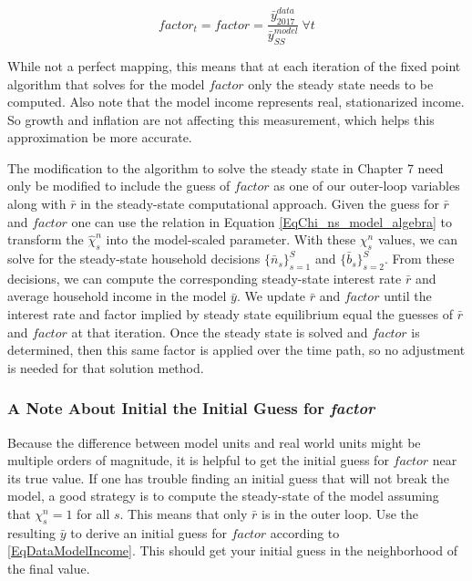 \documentclass[letterpaper,12pt]{article}
\theoremstyle{definition}
\begin{document}
    \begin{equation}
      factor_{t}=factor=\frac{\bar{y}^{data}_{2017}}{\bar{y}^{model}_{SS}} \ \forall t
    \end{equation}

    While not a perfect mapping, this means that at each iteration of the fixed point algorithm that solves for the model $factor$ only the steady state needs to be computed.  Also note that the model income represents real, stationarized income.  So growth and inflation are not affecting this measurement, which helps this approximation be more accurate.

    The modification to the algorithm to solve the steady state in Chapter 7 need only be modified to include the guess of $factor$ as one of our outer-loop variables along with $\bar{r}$ in the steady-state computational approach.  Given the guess for $\bar{r}$ and $factor$ one can use the relation in Equation \ref{EqChi_ns_model_algebra} to transform the $\hat{\chi}^{n}_{s}$ into the model-scaled parameter. With these $\chi^n_s$ values, we can solve for the steady-state household decisions $\{\bar{n}_s\}_{s=1}^S$ and $\{\bar{b}_s\}_{s=2}^S$. From these decisions, we can compute the corresponding steady-state interest rate $\bar{r}$ and average household income in the model $\bar{y}$. We update $\bar{r}$ and $factor$ until the interest rate and factor implied by steady state equilibrium equal the guesses of $\bar{r}$ and $factor$ at that iteration.  Once the steady state is solved and $factor$ is determined, then this same factor is applied over the time path, so no adjustment is needed for that solution method.

  \subsubsection{A Note About Initial the Initial Guess for \textit{factor}}

    Because the difference between model units and real world units might be multiple orders of magnitude, it is helpful to get the initial guess for $factor$ near its true value. If one has trouble finding an initial guess that will not break the model, a good strategy is to compute the steady-state of the model assuming that $\chi^n_s=1$ for all $s$. This means that only $\bar{r}$ is in the outer loop. Use the resulting $\bar{y}$ to derive an initial guess for $factor$ according to \eqref{EqDataModelIncome}. This should get your initial guess in the neighborhood of the final value.
\end{document}
